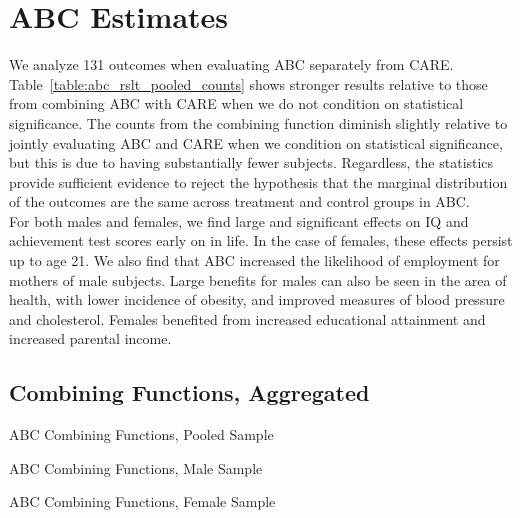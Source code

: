 \section{ABC Estimates}

\noindent We analyze 131 outcomes when evaluating ABC separately from CARE. Table~\ref{table:abc_rslt_pooled_counts} shows stronger results relative to those from combining ABC with CARE when we do not condition on statistical significance. The counts from the combining function diminish slightly relative to jointly evaluating ABC and CARE when we condition on statistical significance, but this is due to having substantially fewer subjects. Regardless, the statistics provide sufficient evidence to reject the hypothesis that the marginal distribution of the outcomes are the same across treatment and control groups in ABC. \\

\noindent For both males and females, we find large and significant effects on IQ and achievement test scores early on in life. In the case of females, these effects persist up to age 21. We also find that ABC increased the likelihood of employment for mothers of male subjects. Large benefits for males can also be seen in the area of health, with lower incidence of obesity, and improved measures of blood pressure and cholesterol. Females benefited from increased educational attainment and increased parental income.\\

\def\arraystretch{0.6}

\setlength\tabcolsep{0.3em}

\subsection{{Combining Functions, Aggregated}}


	\begin{table}[H]
     \caption{ABC Combining Functions, Pooled Sample} 
     \label{table:abc_rslt_pooled_counts}
	
	\end{table}  

	\begin{table}[H]
     \caption{ABC Combining Functions, Male Sample} 
	
	\end{table}  

	\begin{table}[H]
     \caption{ABC Combining Functions, Female Sample} 
	
	\end{table}  
\clearpage

